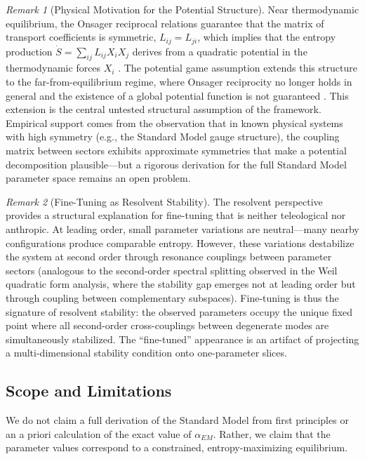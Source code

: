 \documentclass[12pt,a4paper]{article}
\theoremstyle{remark}
\newtheorem{remark}{Remark}
\begin{document}
\begin{remark}[Physical Motivation for the Potential Structure]
\label{rem:potential-motivation}
Near thermodynamic equilibrium, the Onsager reciprocal relations guarantee that the matrix of transport coefficients is symmetric, $L_{ij} = L_{ji}$, which implies that the entropy production $\dot{S} = \sum_{ij} L_{ij} X_i X_j$ derives from a quadratic potential in the thermodynamic forces $X_i$ \citep{Prigogine1967}. The potential game assumption extends this structure to the far-from-equilibrium regime, where Onsager reciprocity no longer holds in general and the existence of a global potential function is not guaranteed \citep{GrinsteinLinsker2007}. This extension is the central untested structural assumption of the framework. Empirical support comes from the observation that in known physical systems with high symmetry (e.g., the Standard Model gauge structure), the coupling matrix between sectors exhibits approximate symmetries that make a potential decomposition plausible---but a rigorous derivation for the full Standard Model parameter space remains an open problem.
\end{remark}

\begin{remark}[Fine-Tuning as Resolvent Stability]
\label{rem:fine-tuning-resolvent}
The resolvent perspective \citep{GeigerRH2026b} provides a structural explanation for fine-tuning that is neither teleological nor anthropic. At leading order, small parameter variations are neutral---many nearby configurations produce comparable entropy. However, these variations destabilize the system at second order through resonance couplings between parameter sectors (analogous to the second-order spectral splitting observed in the Weil quadratic form analysis, where the stability gap emerges not at leading order but through coupling between complementary subspaces). Fine-tuning is thus the signature of resolvent stability: the observed parameters occupy the unique fixed point where all second-order cross-couplings between degenerate modes are simultaneously stabilized. The ``fine-tuned'' appearance is an artifact of projecting a multi-dimensional stability condition onto one-parameter slices.
\end{remark}

\subsection{Scope and Limitations}

We do not claim a full derivation of the Standard Model from first principles or an a priori calculation of the exact value of $\alpha_{EM}$. Rather, we claim that the parameter values correspond to a constrained, entropy-maximizing equilibrium.
\end{document}

